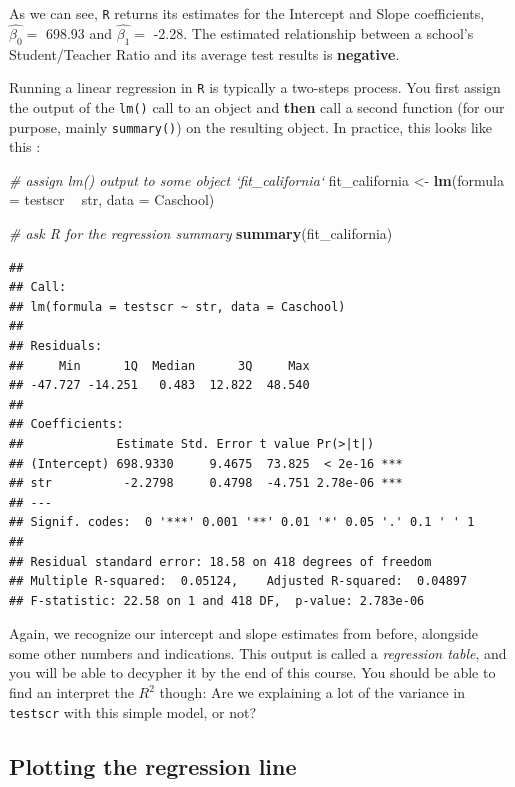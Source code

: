 \documentclass[]{book}
\newenvironment{Shaded}{\begin{snugshade}}{\end{snugshade}}
\newcommand{\KeywordTok}[1]{\textcolor[rgb]{0.13,0.29,0.53}{\textbf{#1}}}
\newcommand{\DataTypeTok}[1]{\textcolor[rgb]{0.13,0.29,0.53}{#1}}
\newcommand{\StringTok}[1]{\textcolor[rgb]{0.31,0.60,0.02}{#1}}
\newcommand{\CommentTok}[1]{\textcolor[rgb]{0.56,0.35,0.01}{\textit{#1}}}
\newcommand{\OperatorTok}[1]{\textcolor[rgb]{0.81,0.36,0.00}{\textbf{#1}}}
\newcommand{\NormalTok}[1]{#1}
\theoremstyle{definition}
\theoremstyle{definition}
\theoremstyle{definition}
\theoremstyle{remark}
\begin{document}
As we can see, \texttt{R} returns its estimates for the Intercept and
Slope coefficients, \(\hat{\beta_0} =\) 698.93 and \(\hat{\beta_1} =\)
-2.28. The estimated relationship between a school's Student/Teacher
Ratio and its average test results is \textbf{negative}.

Running a linear regression in \texttt{R} is typically a two-steps
process. You first assign the output of the \texttt{lm()} call to an
object and \textbf{then} call a second function (for our purpose, mainly
\texttt{summary()}) on the resulting object. In practice, this looks
like this :

\begin{Shaded}
\begin{Highlighting}[]
\CommentTok{# assign lm() output to some object `fit_california`}
\NormalTok{fit_california <-}\StringTok{ }\KeywordTok{lm}\NormalTok{(}\DataTypeTok{formula =}\NormalTok{ testscr }\OperatorTok{~}\StringTok{ }\NormalTok{str, }\DataTypeTok{data =}\NormalTok{ Caschool)}

\CommentTok{# ask R for the regression summary}
\KeywordTok{summary}\NormalTok{(fit_california) }
\end{Highlighting}
\end{Shaded}

\begin{verbatim}
## 
## Call:
## lm(formula = testscr ~ str, data = Caschool)
## 
## Residuals:
##     Min      1Q  Median      3Q     Max 
## -47.727 -14.251   0.483  12.822  48.540 
## 
## Coefficients:
##             Estimate Std. Error t value Pr(>|t|)    
## (Intercept) 698.9330     9.4675  73.825  < 2e-16 ***
## str          -2.2798     0.4798  -4.751 2.78e-06 ***
## ---
## Signif. codes:  0 '***' 0.001 '**' 0.01 '*' 0.05 '.' 0.1 ' ' 1
## 
## Residual standard error: 18.58 on 418 degrees of freedom
## Multiple R-squared:  0.05124,    Adjusted R-squared:  0.04897 
## F-statistic: 22.58 on 1 and 418 DF,  p-value: 2.783e-06
\end{verbatim}

Again, we recognize our intercept and slope estimates from before,
alongside some other numbers and indications. This output is called a
\emph{regression table}, and you will be able to decypher it by the end
of this course. You should be able to find an interpret the \(R^2\)
though: Are we explaining a lot of the variance in \texttt{testscr} with
this simple model, or not?

\subsection{Plotting the regression
line}\label{plotting-the-regression-line}
\end{document}
